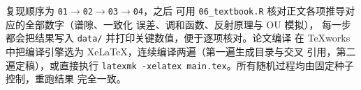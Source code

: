 复现顺序为 \texttt{01}$\to$\texttt{02}$\to$\texttt{03}$\to$\texttt{04}，之后
可用 \texttt{06\_textbook.R} 核对正文各项推导对应的全部数字（谱隙、一致化
误差、调和函数、反射原理与 OU 模拟），
每一步都会把结果写入 \texttt{data/} 并打印关键数值，便于逐项核对。论文编译
在 TeXworks 中把编译引擎选为 XeLaTeX，连续编译两遍（第一遍生成目录与交叉
引用，第二遍定稿），或直接执行
\texttt{latexmk -xelatex main.tex}。所有随机过程均由固定种子控制，重跑结果
完全一致。






